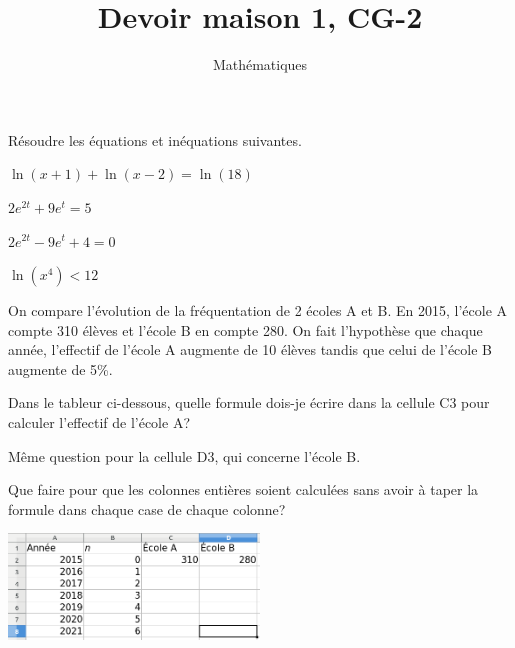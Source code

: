 \documentclass[a4paper,12pt]{scrartcl}
\date{}
\title{Devoir maison 1, CG-2}
\author{Mathématiques}
\begin{document}
\maketitle


Résoudre les équations et inéquations suivantes.

\begin{multicols}{2}

\question{}
$\ln(x+1) + \ln(x-2) = \ln(18)$

\question{}
$2e^{2t} + 9e^t = 5$

\question{}
$2e^{2t} - 9e^t + 4 = 0$

\question{}
$\ln(x^4) < 12$

\end{multicols}


On compare l'évolution de la fréquentation de 2 écoles A et B. En 2015, l'école A compte 310 élèves et l'école B en compte 280. On fait l'hypothèse que chaque année, l'effectif de l'école A augmente de 10 élèves tandis que celui de l'école B augmente de 5\%.



\question{}
Dans le tableur ci-dessous, quelle formule dois-je écrire dans la cellule C3 pour calculer l'effectif de l'école A? 

Même question pour la cellule D3, qui concerne l'école B.

Que faire pour que les colonnes entières soient calculées sans avoir à taper la formule dans chaque case de chaque colonne?

\begin{center}
\includegraphics[width=0.5\textwidth]{pics/1.png}
\end{center}
\end{document}
